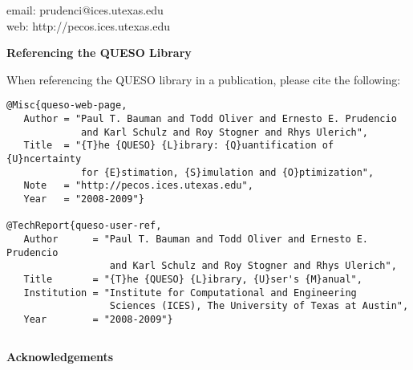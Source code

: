 email: prudenci@ices.utexas.edu\\
web: http://pecos.ices.utexas.edu\\
$~$\\

\centerline{\bf Referencing the QUESO Library}

When referencing the QUESO library in a publication, please cite the following:
\begin{verbatim}
@Misc{queso-web-page,
   Author = "Paul T. Bauman and Todd Oliver and Ernesto E. Prudencio
             and Karl Schulz and Roy Stogner and Rhys Ulerich",
   Title  = "{T}he {QUESO} {L}ibrary: {Q}uantification of {U}ncertainty
             for {E}stimation, {S}imulation and {O}ptimization",
   Note   = "http://pecos.ices.utexas.edu",
   Year   = "2008-2009"}

@TechReport{queso-user-ref,
   Author      = "Paul T. Bauman and Todd Oliver and Ernesto E. Prudencio
                  and Karl Schulz and Roy Stogner and Rhys Ulerich",
   Title       = "{T}he {QUESO} {L}ibrary, {U}ser's {M}anual",
   Institution = "Institute for Computational and Engineering
                  Sciences (ICES), The University of Texas at Austin",
   Year        = "2008-2009"}
\end{verbatim}
$~$\\
$~$\\

\centerline{\bf Acknowledgements}

